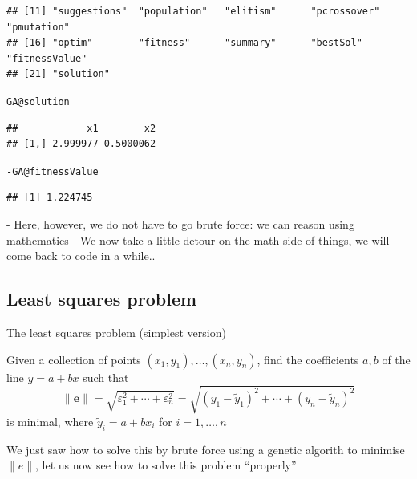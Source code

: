 \documentclass[aspectratio=169]{beamer}\usepackage[]{graphicx}\usepackage[]{xcolor}
\makeatletter
\newcommand{\hlopt}[1]{\textcolor[rgb]{0,0,0}{#1}}%
\newcommand{\hldef}[1]{\textcolor[rgb]{0.345,0.345,0.345}{#1}}%
\newcommand{\hlkwc}[1]{\textcolor[rgb]{0.333,0.667,0.333}{#1}}%
\newenvironment{kframe}{%
 \def\at@end@of@kframe{}%
 \ifinner\ifhmode%
  \def\at@end@of@kframe{\end{minipage}}%
  \begin{minipage}{\columnwidth}%
 \fi\fi%
 \def\FrameCommand##1{\hskip\@totalleftmargin \hskip-\fboxsep
 \colorbox{shadecolor}{##1}\hskip-\fboxsep
     \hskip-\linewidth \hskip-\@totalleftmargin \hskip\columnwidth}%
 \MakeFramed {\advance\hsize-\width
   \@totalleftmargin\z@ \linewidth\hsize
   \@setminipage}}%
 {\par\unskip\endMakeFramed%
 \at@end@of@kframe}
\newenvironment{knitrout}{}{} %
\makeatother
\begin{document}
\begin{frame}[fragile]
\begin{knitrout}
\begin{kframe}
\begin{verbatim}
## [11] "suggestions"  "population"   "elitism"      "pcrossover"   "pmutation"   
## [16] "optim"        "fitness"      "summary"      "bestSol"      "fitnessValue"
## [21] "solution"
\end{verbatim}
\begin{alltt}
\hldef{GA}\hlopt{@}\hlkwc{solution}
\end{alltt}
\begin{verbatim}
##            x1        x2
## [1,] 2.999977 0.5000062
\end{verbatim}
\begin{alltt}
\hlopt{-}\hldef{GA}\hlopt{@}\hlkwc{fitnessValue}
\end{alltt}
\begin{verbatim}
## [1] 1.224745
\end{verbatim}
\end{kframe}
\end{knitrout}

- Here, however, we do not have to go brute force: we can reason using mathematics
- We now take a little detour on the math side of things, we will come back to code in a while..
\end{frame}



\subsection{Least squares problem}

\begin{frame}{The least squares problem (simplest version)}
	\begin{definition}
		Given a collection of points $(x_1,y_1),\ldots,(x_n,y_n)$, find the coefficients $a,b$ of the line $y=a+bx$ such that
		$$
		\|\mathbf{e}\|=\sqrt{\varepsilon_1^2+\cdots+\varepsilon_n^2}
		=\sqrt{(y_1-\tilde y_1)^2+\cdots+(y_n-\tilde y_n)^2}
		$$
		is minimal, where $\tilde y_i=a+bx_i$ for $i=1,\ldots,n$
	\end{definition}
	\vfill
	We just saw how to solve this by brute force using a genetic algorith to minimise $\|e\|$, let us now see how to solve this problem ``properly''
\end{frame}
\end{document}
